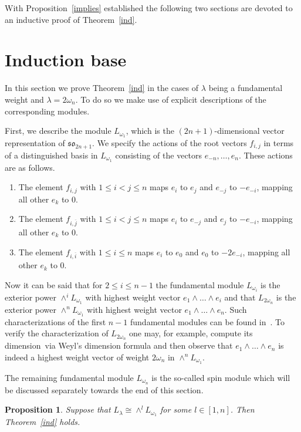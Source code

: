 \documentclass[10pt,a4paper]{article}
\newtheorem{prop}[theo]{Proposition}
\theoremstyle{remark}\newtheorem{rema}[theo]{Remark}
\newcommand{\la}{\lambda}
\begin{document}
With Proposition~\ref{implies} established the following two sections are devoted to an inductive proof of Theorem~\ref{ind}.


\section{Induction base}\label{basesec}

In this section we prove Theorem~\ref{ind} in the cases of $\la$ being a fundamental weight and $\la=2\omega_n$. To do so we make use of explicit descriptions of the corresponding modules.

First, we describe the module $L_{\omega_1}$, which is the $(2n+1)$-dimensional vector representation of $\mathfrak{so}_{2n+1}$. We specify the actions of the root vectors $f_{i,j}$ in terms of a distinguished basis in $L_{\omega_1}$ consisting of the vectors $e_{-n},\dots,e_n$. These actions are as follows.
\begin{enumerate}[label=(\roman*)]
\item\label{sec4_i} The element $f_{i,j}$ with $1\le i<j\le n$ maps $e_i$ to $e_j$ and $e_{-j}$ to $-e_{-i}$, mapping all other $e_k$ to 0.
\item\label{sec4_ii} The element $f_{i,\overline j}$ with $1\le i<j\le n$ maps $e_i$ to $e_{-j}$ and $e_j$ to $-e_{-i}$, mapping all other $e_k$ to 0.
\item\label{sec4_iii} The element $f_{i,\overline i}$ with $1\le i\le n$ maps $e_i$ to $e_0$ and $e_0$ to $-2e_{-i}$, mapping all other $e_k$ to 0.
\end{enumerate}

Now it can be said that for $2\le i\le n-1$ the fundamental module $L_{\omega_i}$ is the exterior power $\wedge^i L_{\omega_1}$ with highest weight vector $e_1\wedge\dots\wedge e_i$ and that $L_{2\omega_n}$ is the exterior power $\wedge^n L_{\omega_1}$ with highest weight vector $e_1\wedge\dots\wedge e_n$. Such characterizations of the first $n-1$ fundamental modules can be found in~\cite{carter}. To verify the characterization of $L_{2\omega_n}$ one may, for example, compute its dimension~via Weyl's dimension formula and then observe that $e_1\wedge\dots\wedge e_n$ is indeed a highest weight vector of weight $2\omega_n$ in $\wedge^n L_{\omega_1}$.

The remaining fundamental module $L_{\omega_n}$ is the so-called spin module which will be discussed separately towards the end of this section.

\begin{prop}\label{base}
Suppose that $L_\lambda\cong \wedge^l L_{\omega_1}$ for some $l\in [1,n]$. Then Theorem~\ref{ind} holds.
\end{prop}
\end{document}
